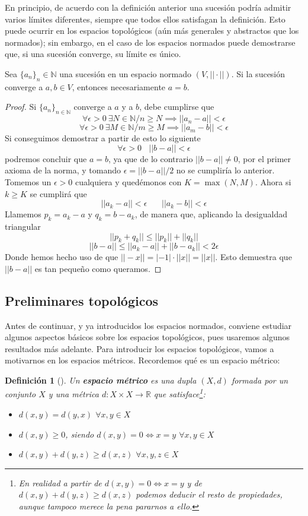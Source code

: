 \documentclass[12pt]{report}
\newtheorem{definition}{Definición}
\newenvironment{dft}[1][]
    {\begin{leftbar}\begin{definition}[#1]}
    {\end{definition}\end{leftbar}}
\begin{document}
En principio, de acuerdo con la definición anterior una sucesión podría admitir varios límites diferentes, siempre que todos ellos satisfagan la definición. Esto puede ocurrir en los espacios topológicos (aún más generales y abstractos que los normados); sin embargo, en el caso de los espacios normados puede demostrarse que, si una sucesión converge, su límite es único.
\begin{thm}
Sea $\{ a_n\}_n\in\mathbb{N}$ una sucesión en un espacio normado $(V,||\cdot ||)$. Si la sucesión converge a $a,b\in V$, entonces necesariamente $a=b$.
\end{thm}
\begin{proof}
Si $\{ a_n\}_{n\in\mathbb{N}}$ converge a $a$ y a $b$, debe cumplirse que
$$\forall \epsilon >0\ \exists N\in\mathbb{N}/n\geq N\implies ||a_n-a||<\epsilon$$
$$\forall \epsilon >0\ \exists M\in\mathbb{N}/m\geq M\implies ||a_m-b||<\epsilon$$
Si conseguimos demostrar a partir de esto lo siguiente
$$\forall \epsilon >0\ \ \ \ ||b-a||<\epsilon$$
podremos concluir que $a=b$, ya que de lo contrario $||b-a||\neq 0$, por el primer axioma de la norma, y tomando $\epsilon =||b-a||/2$ no se cumpliría lo anterior. Tomemos un $\epsilon >0$ cualquiera y quedémonos con $K=\max (N,M)$. Ahora si $k\geq K$ se cumplirá que
$$||a_k-a||<\epsilon\ \ \ \ \ \ \ \ ||a_k-b||<\epsilon$$
Llamemos $p_k=a_k-a$ y $q_k=b-a_k$, de manera que, aplicando la desigualdad triangular
$$||p_k+q_k||\leq ||p_k||+||q_k||$$
$$||b-a||\leq ||a_k-a||+||b-a_k||<2\epsilon$$
Donde hemos hecho uso de que $||-x||=|-1|\cdot ||x||=||x||$. Esto demuestra que $||b-a||$ es tan pequeño como queramos.
\end{proof}



\subsection{Preliminares topológicos}
Antes de continuar, y ya introducidos los espacios normados, conviene estudiar algunos aspectos básicos sobre los espacios topológicos, pues usaremos algunos resultados más adelante. Para introducir los espacios topológicos, vamos a motivarnos en los espacios métricos. Recordemos qué es un espacio métrico:

\begin{dft}
Un \textbf{espacio métrico} es una dupla $(X,d)$ formada por un conjunto $X$ y una métrica $d:X\times X\to\mathbb{R}$ que satisface\footnote{En realidad a partir de $d(x,y)= 0\iff x=y$ y de $d(x,y)+d(y,z)\geq d(x,z)$ podemos deducir el resto de propiedades, aunque tampoco merece la pena pararnos a ello.}:
\begin{itemize}
    \item $d(x,y)=d(y,x)$\hspace{6.75cm} $\forall x,y\in X$
    \item $d(x,y)\geq 0$, siendo $d(x,y)=0\iff x=y$\hspace{2cm} $\forall x,y\in X$
    \item $d(x,y)+d(y,z)\geq d(x,z)$ \hspace{5cm} $\forall x,y,z\in X$
\end{itemize}
\end{dft}
\end{document}
